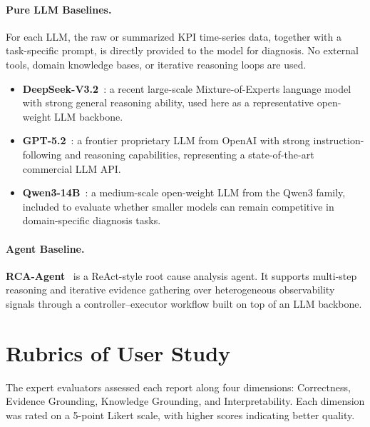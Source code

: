 \documentclass[sigconf,10pt]{acmart} %
\begin{document}
\paragraph{Pure LLM Baselines.}
For each LLM, the raw or summarized KPI time-series data, together with a task-specific prompt, is directly provided to the model for diagnosis. No external tools, domain knowledge bases, or iterative reasoning loops are used.
\begin{itemize}[itemsep=0em, topsep=0em, leftmargin=1em]
    \item \textbf{DeepSeek-V3.2}~\cite{liu2025deepseek}: a recent large-scale Mixture-of-Experts language model with strong general reasoning ability, used here as a representative open-weight LLM backbone.
    
    \item \textbf{GPT-5.2}~\cite{hurst2024gpt}: a frontier proprietary LLM from OpenAI with strong instruction-following and reasoning capabilities, representing a state-of-the-art commercial LLM API.
    
    \item \textbf{Qwen3-14B}~\cite{yang2025qwen3}: a medium-scale open-weight LLM from the Qwen3 family, included to evaluate whether smaller models can remain competitive in domain-specific diagnosis tasks.
\end{itemize}

\paragraph{Agent Baseline.}
\textbf{RCA-Agent}~\cite{xu2025openrca} is a ReAct-style root cause analysis agent. It supports multi-step reasoning and iterative evidence gathering over heterogeneous observability signals through a controller--executor workflow built on top of an LLM backbone.


\section{Rubrics of User Study}
\label{appen:user-study}

The expert evaluators assessed each report along four dimensions: Correctness, Evidence Grounding, Knowledge Grounding, and Interpretability. Each dimension was rated on a 5-point Likert scale, with higher scores indicating better quality.
\end{document}
